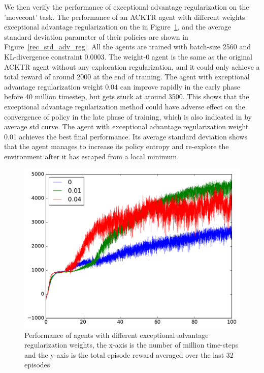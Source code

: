 We then verify the performance of exceptional advantage regularization on the 'movecont' task.
The performance of an ACKTR agent with different weights exceptional advantage regularization on the in Figure~\ref{rec_adv_reg}, and the average standard deviation parameter of their policies are shown in Figure~\ref{rec_std_adv_reg}. All the agents are trained with batch-size 2560 and KL-divergence constraint 0.0003. The weight-0 agent is the same as the original ACKTR agent without any exploration regularization, and it could only achieve a total reward of around 2000 at the end of training. The agent with exceptional advantage regularization weight 0.04 can improve rapidly in the early phase before 40 million timestep, but gets stuck at around 3500. This shows that the exceptional advantage regularization method could have adverse effect on the convergence of policy in the late phase of training, which is also indicated in by average std curve. The agent with exceptional advantage regularization weight 0.01 achieves the best final performance. Its average standard deviation shows that the agent manages to increase its policy entropy and re-explore the environment after it has escaped from a local minimum.
\begin{figure}[!htbp]
	\includegraphics[width=\textwidth]{images/rec_adv_reg.pdf}
	\centering
	\caption{Performance of agents with different exceptional advantage regularization weights, the x-axis is the number of million time-steps and the y-axis is the total episode reward averaged over the last 32 episodes}\label{rec_adv_reg}
\end{figure}

